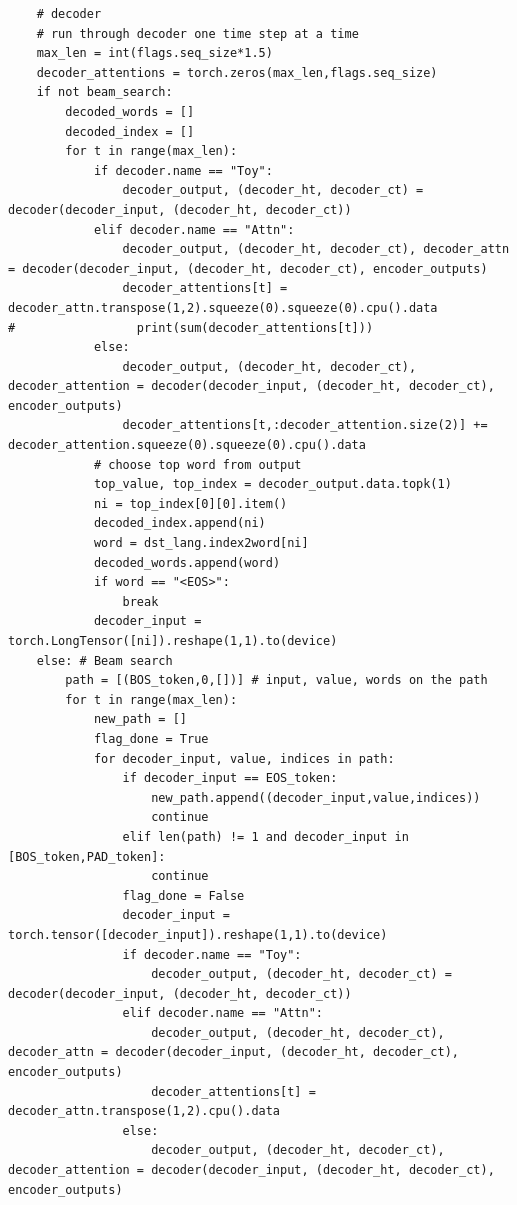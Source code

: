 \documentclass[logo,reportComp]{thesis}
\begin{document}
\begin{lstlisting}
    # decoder
    # run through decoder one time step at a time
    max_len = int(flags.seq_size*1.5)
    decoder_attentions = torch.zeros(max_len,flags.seq_size)
    if not beam_search:
        decoded_words = []
        decoded_index = []
        for t in range(max_len):
            if decoder.name == "Toy":
                decoder_output, (decoder_ht, decoder_ct) = decoder(decoder_input, (decoder_ht, decoder_ct))
            elif decoder.name == "Attn":
                decoder_output, (decoder_ht, decoder_ct), decoder_attn = decoder(decoder_input, (decoder_ht, decoder_ct), encoder_outputs)
                decoder_attentions[t] = decoder_attn.transpose(1,2).squeeze(0).squeeze(0).cpu().data
#                 print(sum(decoder_attentions[t]))
            else:
                decoder_output, (decoder_ht, decoder_ct), decoder_attention = decoder(decoder_input, (decoder_ht, decoder_ct), encoder_outputs)
                decoder_attentions[t,:decoder_attention.size(2)] += decoder_attention.squeeze(0).squeeze(0).cpu().data
            # choose top word from output
            top_value, top_index = decoder_output.data.topk(1)
            ni = top_index[0][0].item()
            decoded_index.append(ni)
            word = dst_lang.index2word[ni]
            decoded_words.append(word)
            if word == "<EOS>":
                break
            decoder_input = torch.LongTensor([ni]).reshape(1,1).to(device)
    else: # Beam search
        path = [(BOS_token,0,[])] # input, value, words on the path
        for t in range(max_len):
            new_path = []
            flag_done = True
            for decoder_input, value, indices in path:
                if decoder_input == EOS_token:
                    new_path.append((decoder_input,value,indices))
                    continue
                elif len(path) != 1 and decoder_input in [BOS_token,PAD_token]:
                    continue
                flag_done = False
                decoder_input = torch.tensor([decoder_input]).reshape(1,1).to(device)
                if decoder.name == "Toy":
                    decoder_output, (decoder_ht, decoder_ct) = decoder(decoder_input, (decoder_ht, decoder_ct))
                elif decoder.name == "Attn":
                    decoder_output, (decoder_ht, decoder_ct), decoder_attn = decoder(decoder_input, (decoder_ht, decoder_ct), encoder_outputs)
                    decoder_attentions[t] = decoder_attn.transpose(1,2).cpu().data
                else:
                    decoder_output, (decoder_ht, decoder_ct), decoder_attention = decoder(decoder_input, (decoder_ht, decoder_ct), encoder_outputs)

\end{lstlisting}
\end{document}
